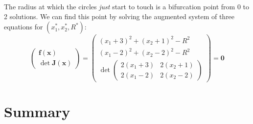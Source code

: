 \begin{exampleBox}
\begin{center}
\begin{tikzpicture}[>=latex, scale=0.8]
    \end{tikzpicture}
    \end{center}   

    The radius at which the circles \emph{just} start to touch is a bifurcation point from 0 to 2 solutions. We can find this point by solving the augmented system of three equations for $(x_1^*, x_2^*, R^*)$:
    \[ 
    \begin{pmatrix} \mathbf f(\mathbf x) \\ \det \mathbf{J}(\mathbf x) \end{pmatrix} = \begin{pmatrix}
    (x_1 + 3)^2 + (x_2 + 1)^2 - R^2 \\ (x_1 - 2)^2 + (x_2 - 2)^2 - R^2 \\ \det \begin{pmatrix} 2 (x_1 + 3) & 2 ( x_2 + 1) \\ 2 (x_1 - 2) & 2 (x_2 - 2) \end{pmatrix}
    \end{pmatrix} = \mathbf 0
    \]



\end{exampleBox}


\section{Summary}




